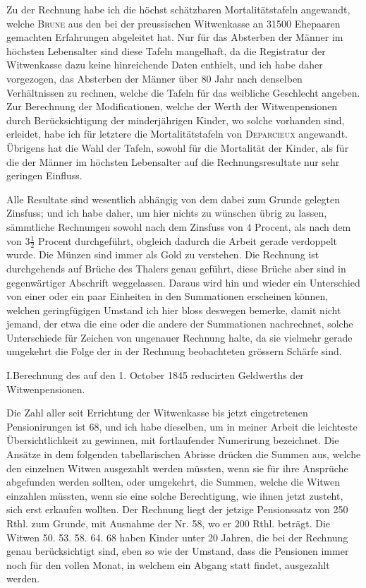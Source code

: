 \par{}
Zu der Rechnung habe ich die höchst schätzbaren Mortalitätstafeln angewandt, welche \textsc{Brune} aus den bei der preussischen Witwenkasse an 31500 Ehepaaren gemachten Erfahrungen abgeleitet hat. Nur für das Absterben der Männer im höchsten Lebensalter sind diese Tafeln mangelhaft, da die Registratur der Witwenkasse dazu keine hinreichende Daten enthielt, und ich habe daher vorgezogen, das Absterben der Männer über 80 Jahr nach denselben Verhältnissen zu rechnen, welche die Tafeln für das weibliche Geschlecht angeben. Zur Berechnung der Modificationen, welche der Werth der Witwenpensionen durch Berücksichtigung der minderjährigen Kinder, wo solche vorhanden sind, erleidet, habe ich für letztere die Mortalitätstafeln von \textsc{Deparcieux} angewandt. Übrigens hat die Wahl der Tafeln, sowohl für die Mortalität der Kinder, als für die der Männer im höchsten Lebensalter auf die Rechnungsresultate nur sehr geringen Einfluss.

Alle Resultate sind wesentlich abhängig von dem dabei zum Grunde gelegten Zinsfuss; und ich habe daher, um hier nichts zu wünschen übrig zu lassen, sämmtliche Rechnungen sowohl nach dem Zinsfuss von 4 Procent, als nach dem von \(3\tfrac{1}{2}\) Procent durchgeführt, obgleich dadurch die Arbeit gerade verdoppelt wurde. Die Münzen sind immer als Gold zu verstehen. Die Rechnung ist durchgehends auf Brüche des Thalers genau geführt, diese Brüche aber sind in gegenwärtiger Abschrift weggelassen. Daraus wird hin und wieder ein Unterschied von einer oder ein paar Einheiten in den Summationen erscheinen können, welchen geringfügigen Umstand ich hier bloss deswegen bemerke, damit nicht jemand, der etwa die eine oder die andere der Summationen nachrechnet, solche Unterschiede für Zeichen von ungenauer Rechnung halte, da sie vielmehr gerade umgekehrt die Folge der in der Rechnung beobachteten grössern Schärfe sind.

\par\medskip\noindent I.\quad Berechnung des auf den 1. October 1845 reducirten Geldwerths der Witwenpensionen.\par\smallskip
Die Zahl aller seit Errichtung der Witwenkasse bis jetzt eingetretenen Pensionirungen ist 68, und ich habe dieselben, um in meiner Arbeit die leichteste Übersichtlichkeit zu gewinnen, mit fortlaufender Numerirung bezeichnet. Die Ansätze in dem folgenden tabellarischen Abrisse drücken die Summen aus, welche den einzelnen Witwen ausgezahlt werden müssten, wenn sie für ihre Ansprüche abgefunden werden sollten, oder umgekehrt, die Summen, welche die Witwen einzahlen müssten, wenn sie eine solche Berechtigung, wie ihnen jetzt zusteht, sich erst erkaufen wollten. Der Rechnung liegt der jetzige Pensionssatz von 250 Rthl. zum Grunde, mit Ausnahme der Nr. 58, wo er 200 Rthl. beträgt. Die Witwen 50. 53. 58. 64. 68 haben Kinder unter 20 Jahren, die bei der Rechnung genau berücksichtigt sind, eben so wie der Umstand, dass die Pensionen immer noch für den vollen Monat, in welchem ein Abgang statt findet, ausgezahlt werden.

